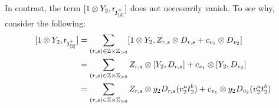 \begin{remark}
\begin{enumerate}
\begin{enumerate}
                        In contrast, the term $[1 \tensor Y_2, \sfr_{\z_{[2]}^+}]$ does not necessarily vanish. To see why, consider the following:
                            $$
                                \begin{aligned}
                                    [1 \tensor Y_2, \sfr_{\z_{[2]}^+}] & = \sum_{(r, s) \in \Z \x \Z_{> 0}} [1 \tensor Y_2, Z_{r, s} \tensor D_{r, s} + c_{v_1} \tensor D_{v_2}]
                                    \\
                                    & = \sum_{(r, s) \in \Z \x \Z_{> 0}} Z_{r, s} \tensor [Y_2, D_{r, s}] + c_{v_1} \tensor [Y_2, D_{v_2}]
                                    \\
                                    & = \sum_{(r, s) \in \Z \x \Z_{> 0}} Z_{r, s} \tensor y_2 D_{r, s}(v_2^a t_2^b) + c_{v_1} \tensor y_2 D_{v_2}(v_2^a t_2^b)
                                \end{aligned}
                            $$


\end{enumerate}
\end{enumerate}
\end{remark}
